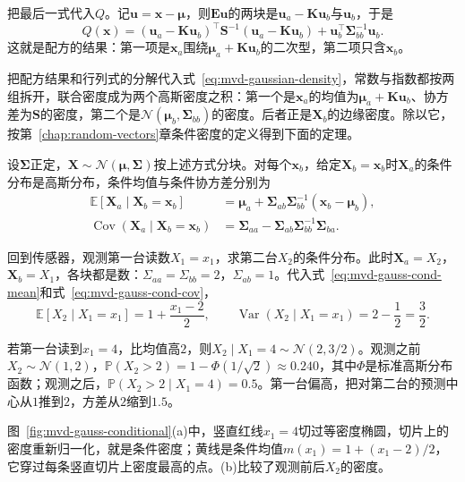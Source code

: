 把最后一式代入$Q$。记$\bm{u}=\bm{x}-\bm{\mu}$，则$\bm{E}\bm{u}$的两块是$\bm{u}_a-\bm{K}\bm{u}_b$与$\bm{u}_b$，于是
\[
 Q(\bm{x})=(\bm{u}_a-\bm{K}\bm{u}_b)^{\top}\bm{S}^{-1}(\bm{u}_a-\bm{K}\bm{u}_b)+\bm{u}_b^{\top}\bm{\Sigma}_{bb}^{-1}\bm{u}_b .
\]
这就是配方的结果：第一项是$\bm{x}_a$围绕$\bm{\mu}_a+\bm{K}\bm{u}_b$的二次型，第二项只含$\bm{x}_b$。

把配方结果和行列式的分解代入式~\eqref{eq:mvd-gaussian-density}，常数与指数都按两组拆开，联合密度成为两个高斯密度之积：第一个是$\bm{x}_a$的均值为$\bm{\mu}_a+\bm{K}\bm{u}_b$、协方差为$\bm{S}$的密度，第二个是$\mathcal{N}(\bm{\mu}_b,\bm{\Sigma}_{bb})$的密度。后者正是$\bm{X}_b$的边缘密度。除以它，按第~\ref{chap:random-vectors}章条件密度的定义得到下面的定理。

\begin{theorem}[高斯条件分布]
\label{thm:mvd-gaussian-conditional}
设$\bm{\Sigma}$正定，$\bm{X}\sim\mathcal{N}(\bm{\mu},\bm{\Sigma})$按上述方式分块。对每个$\bm{x}_b$，给定$\bm{X}_b=\bm{x}_b$时$\bm{X}_a$的条件分布是高斯分布，条件均值与条件协方差分别为
\begin{align}
 \mathbb{E}[\bm{X}_a\mid\bm{X}_b=\bm{x}_b]&=\bm{\mu}_a+\bm{\Sigma}_{ab}\bm{\Sigma}_{bb}^{-1}(\bm{x}_b-\bm{\mu}_b),
 \label{eq:mvd-gauss-cond-mean}\\
 \operatorname{Cov}(\bm{X}_a\mid\bm{X}_b=\bm{x}_b)&=\bm{\Sigma}_{aa}-\bm{\Sigma}_{ab}\bm{\Sigma}_{bb}^{-1}\bm{\Sigma}_{ba} .
 \label{eq:mvd-gauss-cond-cov}
\end{align}
\end{theorem}

回到传感器，观测第一台读数$X_1=x_1$，求第二台$X_2$的条件分布。此时$\bm{X}_a=X_2$，$\bm{X}_b=X_1$，各块都是数：$\Sigma_{aa}=\Sigma_{bb}=2$，$\Sigma_{ab}=1$。代入式~\eqref{eq:mvd-gauss-cond-mean}和式~\eqref{eq:mvd-gauss-cond-cov}，
\[
 \mathbb{E}[X_2\mid X_1=x_1]=1+\frac{x_1-2}{2},\qquad \operatorname{Var}(X_2\mid X_1=x_1)=2-\frac{1}{2}=\frac32 .
\]

若第一台读到$x_1=4$，比均值高$2$，则$X_2\mid X_1=4\sim\mathcal{N}(2,3/2)$。观测之前$X_2\sim\mathcal{N}(1,2)$，$\mathbb{P}(X_2>2)=1-\Phi(1/\sqrt2)\approx0.240$，其中$\Phi$是标准高斯分布函数；观测之后，$\mathbb{P}(X_2>2\mid X_1=4)=0.5$。第一台偏高，把对第二台的预测中心从$1$推到$2$，方差从$2$缩到$1.5$。

图~\ref{fig:mvd-gauss-conditional}(a)中，竖直红线$x_1=4$切过等密度椭圆，切片上的密度重新归一化，就是条件密度；黄线是条件均值$m(x_1)=1+(x_1-2)/2$，它穿过每条竖直切片上密度最高的点。(b)比较了观测前后$X_2$的密度。

